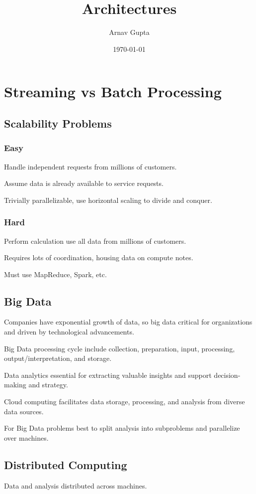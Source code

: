 \documentclass[11pt]{article}
\author{Arnav Gupta}
\date{\today}
\title{Architectures}
\begin{document}
\maketitle
\tableofcontents

\section{Streaming vs Batch Processing}
\label{sec:org629aeea}
\subsection{Scalability Problems}
\label{sec:orga3c619f}
\subsubsection{Easy}
\label{sec:orgc936337}
Handle independent requests from millions of customers.

Assume data is already available to service requests.

Trivially parallelizable, use horizontal scaling to divide and conquer.
\subsubsection{Hard}
\label{sec:org0bf3136}
Perform calculation use all data from millions of customers.

Requires lots of coordination, housing data on compute notes.

Must use MapReduce, Spark, etc.
\subsection{Big Data}
\label{sec:org01f22b5}
Companies have exponential growth of data, so big data critical
for organizations and driven by technological advancements.

Big Data processing cycle include collection, preparation, input, processing,
output/interpretation, and storage.

Data analytics essential for extracting valuable insights and support
decision-making and strategy.

Cloud computing facilitates data storage, processing, and analysis from
diverse data sources.

For Big Data problems best to split analysis into subproblems and parallelize
over machines.
\subsection{Distributed Computing}
\label{sec:org5071234}
Data and analysis distributed across machines.
\end{document}
